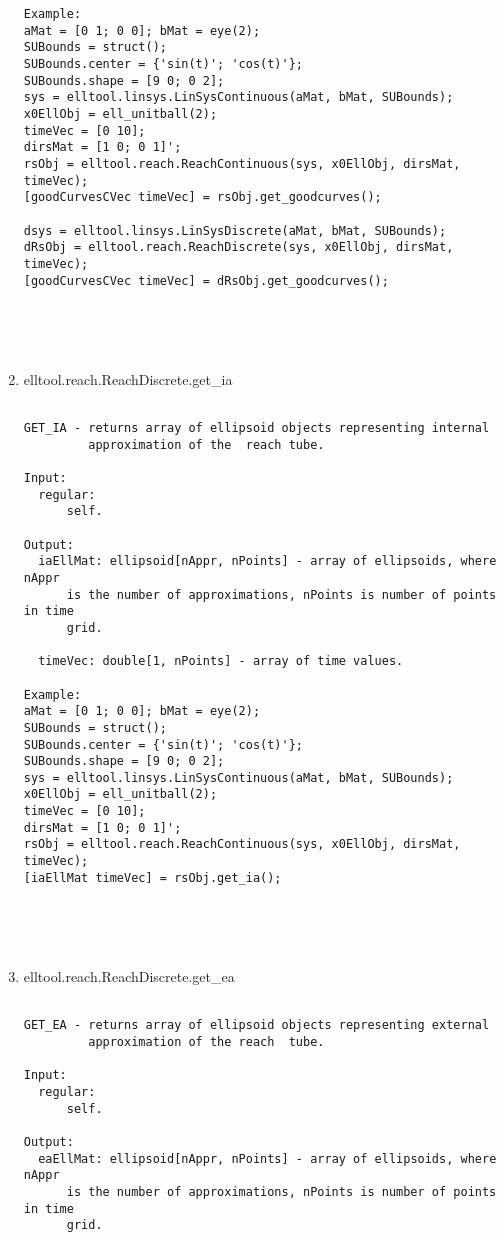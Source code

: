 \begin{enumerate}
\begin{lstlisting}
Example:
aMat = [0 1; 0 0]; bMat = eye(2);
SUBounds = struct();
SUBounds.center = {'sin(t)'; 'cos(t)'};
SUBounds.shape = [9 0; 0 2];
sys = elltool.linsys.LinSysContinuous(aMat, bMat, SUBounds);
x0EllObj = ell_unitball(2);
timeVec = [0 10];
dirsMat = [1 0; 0 1]';
rsObj = elltool.reach.ReachContinuous(sys, x0EllObj, dirsMat, timeVec);
[goodCurvesCVec timeVec] = rsObj.get_goodcurves();

dsys = elltool.linsys.LinSysDiscrete(aMat, bMat, SUBounds);
dRsObj = elltool.reach.ReachDiscrete(sys, x0EllObj, dirsMat, timeVec);
[goodCurvesCVec timeVec] = dRsObj.get_goodcurves();





\end{lstlisting}
\fontfamily{\familydefault}
\selectfont
\item {elltool.reach.ReachDiscrete.get\_ia}
\selectfont
\begin{lstlisting}

GET_IA - returns array of ellipsoid objects representing internal
         approximation of the  reach tube.

Input:
  regular:
      self.

Output:
  iaEllMat: ellipsoid[nAppr, nPoints] - array of ellipsoids, where nAppr
      is the number of approximations, nPoints is number of points in time
      grid.

  timeVec: double[1, nPoints] - array of time values.

Example:
aMat = [0 1; 0 0]; bMat = eye(2);
SUBounds = struct();
SUBounds.center = {'sin(t)'; 'cos(t)'};
SUBounds.shape = [9 0; 0 2];
sys = elltool.linsys.LinSysContinuous(aMat, bMat, SUBounds);
x0EllObj = ell_unitball(2);
timeVec = [0 10];
dirsMat = [1 0; 0 1]';
rsObj = elltool.reach.ReachContinuous(sys, x0EllObj, dirsMat, timeVec);
[iaEllMat timeVec] = rsObj.get_ia();





\end{lstlisting}
\fontfamily{\familydefault}
\selectfont
\item {elltool.reach.ReachDiscrete.get\_ea}
\selectfont
\begin{lstlisting}

GET_EA - returns array of ellipsoid objects representing external
         approximation of the reach  tube.

Input:
  regular:
      self.

Output:
  eaEllMat: ellipsoid[nAppr, nPoints] - array of ellipsoids, where nAppr
      is the number of approximations, nPoints is number of points in time
      grid.


\end{lstlisting}
\end{enumerate}
